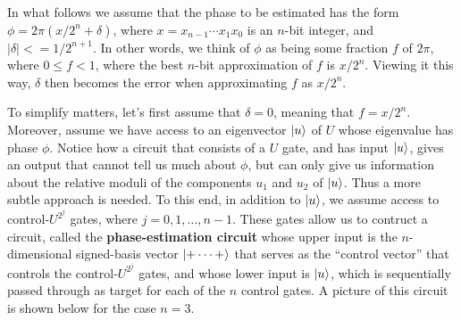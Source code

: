\documentclass [12pt]{article}
\theoremstyle{definition}
\begin{document}
In what follows we assume that the phase to be estimated has the form $\phi = 2\pi(x/2^n + \delta)$, where $x=x_{n-1}\cdots x_1x_0$ is an $n$-bit integer, and $|\delta| <= 1/2^{n+1}$.
In other words, we think of $\phi$ as being some fraction $f$ of $2\pi$, where $0\leq f < 1$, where the best $n$-bit approximation of $f$ is $x/2^n$. Viewing it this way, 
$\delta$ then becomes the error when approximating $f$ as $x/2^n$. 

To simplify matters, let's first assume that $\delta=0$, meaning that $f=x/2^n$. Moreover, assume we have access to an eigenvector $\ket{u}$ of $U$ whose eigenvalue has phase 
$\phi$. Notice how a circuit that consists of a $U$ gate, and has input $\ket{u}$, gives an output that cannot tell us much about $\phi$, but can only give us information about the 
relative moduli of the components $u_1$ and $u_2$ of $\ket{u}$. Thus a more subtle approach is needed. To this end, in addition to $\ket{u}$, we assume access to 
control-$U^{2^j}$ gates, where $j=0,1,\ldots,n-1$. These gates allow us to contruct a circuit, called the \textbf{phase-estimation circuit} whose upper input is the $n$-dimensional signed-basis vector $\ket{+\cdots +}$ 
that serves as the ``control vector'' that controls the control-$U^{2^j}$ gates,
and whose lower input is $\ket{u}$, which is sequentially passed through as target for each of the $n$ control gates. A picture of this circuit is shown below for the case $n=3$.
\end{document}
